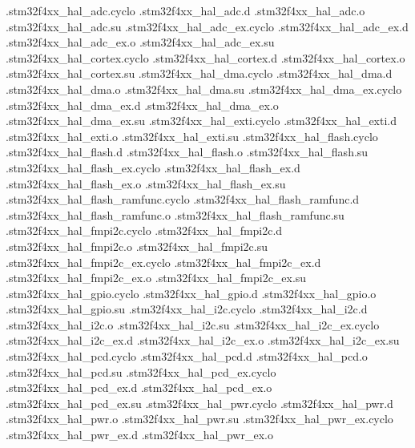 \documentclass{article}
\begin{document}
{            .stm32f4xx_hal_adc.cyclo
            .stm32f4xx_hal_adc.d
            .stm32f4xx_hal_adc.o
            .stm32f4xx_hal_adc.su
            .stm32f4xx_hal_adc_ex.cyclo
            .stm32f4xx_hal_adc_ex.d
            .stm32f4xx_hal_adc_ex.o
            .stm32f4xx_hal_adc_ex.su
            .stm32f4xx_hal_cortex.cyclo
            .stm32f4xx_hal_cortex.d
            .stm32f4xx_hal_cortex.o
            .stm32f4xx_hal_cortex.su
            .stm32f4xx_hal_dma.cyclo
            .stm32f4xx_hal_dma.d
            .stm32f4xx_hal_dma.o
            .stm32f4xx_hal_dma.su
            .stm32f4xx_hal_dma_ex.cyclo
            .stm32f4xx_hal_dma_ex.d
            .stm32f4xx_hal_dma_ex.o
            .stm32f4xx_hal_dma_ex.su
            .stm32f4xx_hal_exti.cyclo
            .stm32f4xx_hal_exti.d
            .stm32f4xx_hal_exti.o
            .stm32f4xx_hal_exti.su
            .stm32f4xx_hal_flash.cyclo
            .stm32f4xx_hal_flash.d
            .stm32f4xx_hal_flash.o
            .stm32f4xx_hal_flash.su
            .stm32f4xx_hal_flash_ex.cyclo
            .stm32f4xx_hal_flash_ex.d
            .stm32f4xx_hal_flash_ex.o
            .stm32f4xx_hal_flash_ex.su
            .stm32f4xx_hal_flash_ramfunc.cyclo
            .stm32f4xx_hal_flash_ramfunc.d
            .stm32f4xx_hal_flash_ramfunc.o
            .stm32f4xx_hal_flash_ramfunc.su
            .stm32f4xx_hal_fmpi2c.cyclo
            .stm32f4xx_hal_fmpi2c.d
            .stm32f4xx_hal_fmpi2c.o
            .stm32f4xx_hal_fmpi2c.su
            .stm32f4xx_hal_fmpi2c_ex.cyclo
            .stm32f4xx_hal_fmpi2c_ex.d
            .stm32f4xx_hal_fmpi2c_ex.o
            .stm32f4xx_hal_fmpi2c_ex.su
            .stm32f4xx_hal_gpio.cyclo
            .stm32f4xx_hal_gpio.d
            .stm32f4xx_hal_gpio.o
            .stm32f4xx_hal_gpio.su
            .stm32f4xx_hal_i2c.cyclo
            .stm32f4xx_hal_i2c.d
            .stm32f4xx_hal_i2c.o
            .stm32f4xx_hal_i2c.su
            .stm32f4xx_hal_i2c_ex.cyclo
            .stm32f4xx_hal_i2c_ex.d
            .stm32f4xx_hal_i2c_ex.o
            .stm32f4xx_hal_i2c_ex.su
            .stm32f4xx_hal_pcd.cyclo
            .stm32f4xx_hal_pcd.d
            .stm32f4xx_hal_pcd.o
            .stm32f4xx_hal_pcd.su
            .stm32f4xx_hal_pcd_ex.cyclo
            .stm32f4xx_hal_pcd_ex.d
            .stm32f4xx_hal_pcd_ex.o
            .stm32f4xx_hal_pcd_ex.su
            .stm32f4xx_hal_pwr.cyclo
            .stm32f4xx_hal_pwr.d
            .stm32f4xx_hal_pwr.o
            .stm32f4xx_hal_pwr.su
            .stm32f4xx_hal_pwr_ex.cyclo
            .stm32f4xx_hal_pwr_ex.d
            .stm32f4xx_hal_pwr_ex.o
}
\end{document}
